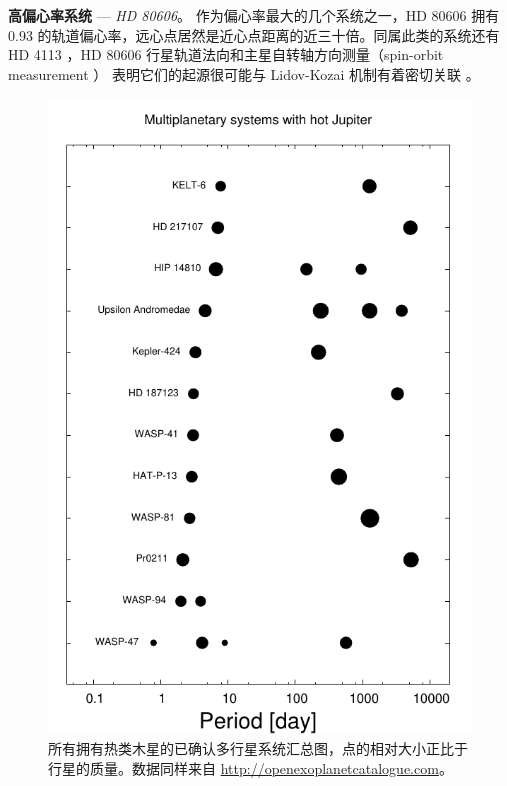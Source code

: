 \textbf{高偏心率系统} --- \textit{HD 80606}。  {}  作为偏心率最大的几个系统之一，HD 80606 拥有 0.93 
的轨道偏心率\cite{Naef2001}，远心点居然是近心点距离的近三十倍。同属此类的系统还有 HD 4113
\cite{Tamuz2008}，HD 80606 行星轨道法向和主星自转轴方向测量（spin-orbit measurement ）
\cite{Pont2009}表明它们的起源很可能与 Lidov-Kozai 机制\cite{Lidov1962,Kozai1962}有着密切关联
\cite{Wu2003}。


\begin{figure}[t]
\centering
\includegraphics[width=1.0\textwidth]{figures/chapter1/fig15_hjmul.pdf}
\caption{所有拥有热类木星的已确认多行星系统汇总图，点的相对大小正比于行星的质量。数据同样来自 \url{http://openexoplanetcatalogue.com}。}
\label{fig:hjwcomp}
\end{figure}


